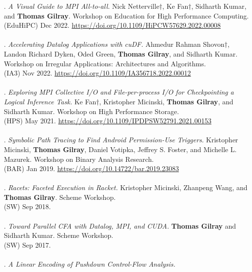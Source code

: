 \paper. \textit{A Visual Guide to MPI All-to-all.}
Nick Netterville$\dagger$, Ke Fan$\dagger$, Sidharth Kumar, and \textbf{Thomas Gilray}.
Workshop on Education for High Performance Computing.
\\(EduHiPC) Dec 2022. \url{https://doi.org/10.1109/HiPCW57629.2022.00008}
\\ \vspace{-0.1cm}\\
\paper. \textit{Accelerating Datalog Applications with cuDF.}
Ahmedur Rahman Shovon$\dagger$, Landon Richard Dyken, Oded Green, \textbf{Thomas Gilray}, and Sidharth Kumar.
Workshop on Irregular Applications: Architectures and Algorithms.
\\(IA3) Nov 2022. \url{https://doi.org/10.1109/IA356718.2022.00012}
\\ \vspace{-0.1cm}\\
\paper. \textit{Exploring MPI Collective I/O and File-per-process I/O for Checkpointing a Logical Inference Task.}
Ke Fan$\dagger$, Kristopher Micinski, \textbf{Thomas Gilray}, and Sidharth Kumar.
Workshop on High Performance Storage.
\\(HPS) May 2021. \url{https://doi.org/10.1109/IPDPSW52791.2021.00153}
\\ \vspace{-0.1cm}\\
\paper. \textit{Symbolic Path Tracing to Find Android Permission-Use Triggers.}
Kristopher Micinski, \textbf{Thomas Gilray}, Daniel Votipka, Jeffrey S. Foster, and Michelle L. Mazurek.
Workshop on Binary Analysis Research.
\\(BAR) Jan 2019. \url{https://doi.org/10.14722/bar.2019.23083}
\\ \vspace{-0.1cm}\\
\paper. \textit{Racets: Faceted Execution in Racket.}
Kristopher Micinski, Zhanpeng Wang, and \textbf{Thomas Gilray}.
Scheme Workshop.
\\(SW) Sep 2018.
\\ \vspace{-0.1cm}\\
\paper. \textit{Toward Parallel CFA with Datalog, MPI, and CUDA.}
\textbf{Thomas Gilray} and Sidharth Kumar.
Scheme Workshop.
\\(SW) Sep 2017.
\\ \vspace{-0.1cm}\\
\paper. \textit{A Linear Encoding of Pushdown Control-Flow Analysis.}
